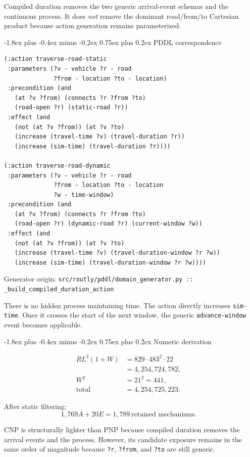 \documentclass[11pt,a4paper]{article}
\makeatletter
\renewcommand{\subsection}{\@startsection{subsection}{2}{0pt}
  {-1.8ex plus -0.4ex minus -0.2ex}
  {0.75ex plus 0.2ex}
  {\normalfont\large\bfseries\color{RoutlyNavy}}}
\newcommand{\codeorigin}[1]{%
  {\footnotesize\textcolor{RoutlyMuted}{Generator origin: \texttt{#1}}\par}
}
\makeatother
\begin{document}
Compiled duration removes the two generic arrival-event schemas and the
continuous process. It does \emph{not} remove the dominant road/from/to
Cartesian product because action generation remains parameterized.

\subsection{PDDL correspondence}

\begin{lstlisting}
(:action traverse-road-static
 :parameters (?v - vehicle ?r - road
              ?from - location ?to - location)
 :precondition (and
   (at ?v ?from) (connects ?r ?from ?to)
   (road-open ?r) (static-road ?r))
 :effect (and
   (not (at ?v ?from)) (at ?v ?to)
   (increase (travel-time ?v) (travel-duration ?r))
   (increase (sim-time) (travel-duration ?r))))

(:action traverse-road-dynamic
 :parameters (?v - vehicle ?r - road
              ?from - location ?to - location
              ?w - time-window)
 :precondition (and
   (at ?v ?from) (connects ?r ?from ?to)
   (road-open ?r) (dynamic-road ?r) (current-window ?w))
 :effect (and
   (not (at ?v ?from)) (at ?v ?to)
   (increase (travel-time ?v) (travel-duration-window ?r ?w))
   (increase (sim-time) (travel-duration-window ?r ?w))))
\end{lstlisting}
\codeorigin{src/routly/pddl/domain\_generator.py :: \_build\_compiled\_duration\_action}

There is no hidden process maintaining time. The action directly increases
\texttt{sim-time}. Once it crosses the start of the next window, the generic
\texttt{advance-window} event becomes applicable.

\subsection{Numeric derivation}

\[
\begin{aligned}
R L^2(1+W)
&=829\cdot483^2\cdot22\\
&=4{,}254{,}724{,}782,\\
W^2&=21^2=441,\\
\text{total}
&=4{,}254{,}725{,}223.
\end{aligned}
\]

After static filtering:
\[
\boxed{1{,}769A+20E=1{,}789\ \text{retained mechanisms}.}
\]

\begin{defencebox}
CNP is structurally lighter than PNP because compiled duration removes the
arrival events and the process. However, its candidate exposure remains in the
same order of magnitude because \texttt{?r}, \texttt{?from}, and \texttt{?to}
are still generic.
\end{defencebox}
\end{document}
